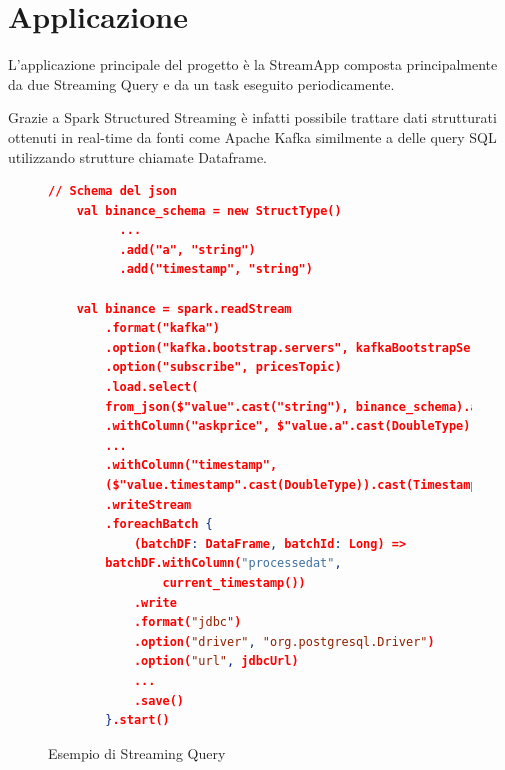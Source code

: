 \section{Applicazione}

L'applicazione principale del progetto è la StreamApp composta principalmente da due Streaming
Query e da un task eseguito periodicamente.

Grazie a Spark Structured Streaming è infatti possibile trattare dati strutturati ottenuti in
real-time da fonti come Apache Kafka similmente a delle query SQL utilizzando strutture chiamate
Dataframe.

\begin{figure}
    \begin{lstlisting}[language=json,firstnumber=1]
    // Schema del json
    val binance_schema = new StructType()
          ...
          .add("a", "string")
          .add("timestamp", "string")
    
    val binance = spark.readStream
        .format("kafka")
        .option("kafka.bootstrap.servers", kafkaBootstrapServers)
        .option("subscribe", pricesTopic)
        .load.select(
        from_json($"value".cast("string"), binance_schema).alias("value"))
        .withColumn("askprice", $"value.a".cast(DoubleType))
        ...
        .withColumn("timestamp",
        ($"value.timestamp".cast(DoubleType)).cast(TimestampType))
        .writeStream
        .foreachBatch {
            (batchDF: DataFrame, batchId: Long) =>
        batchDF.withColumn("processedat",
                current_timestamp())
            .write
            .format("jdbc")
            .option("driver", "org.postgresql.Driver")
            .option("url", jdbcUrl)
            ...
            .save()
        }.start()
    \end{lstlisting}
    \caption{Esempio di Streaming Query}
    \label{streamingquery}
    \end{figure}

